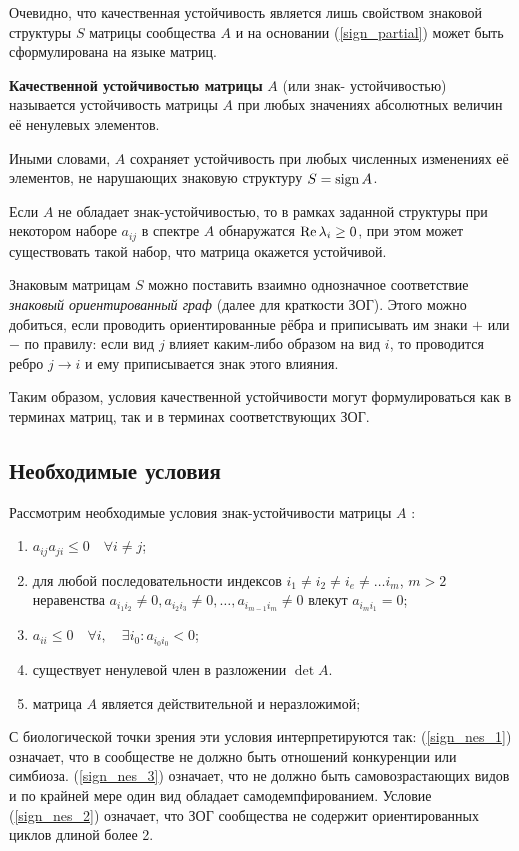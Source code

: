     Очевидно, что качественная устойчивость является лишь свойством знаковой структуры \(S\) матрицы сообщества \(A\) и на основании (\ref{sign_partial}) может быть сформулирована на языке матриц.
    \begin{definition}
        \textbf{Качественной устойчивостью матрицы} \(A\) (или знак- \hspace{-2pt}устойчивостью) называется устойчивость матрицы \(A\) при любых значениях абсолютных величин её ненулевых элементов.
    \end{definition}
    Иными словами, \(A\) сохраняет устойчивость при любых численных изменениях её элементов, не нарушающих знаковую структуру \(S = \operatorname{sign} A\).

    Если \(A\) не обладает знак-устойчивостью, то в рамках заданной структуры при некотором наборе \({a_{ij}}\) в спектре \(A\) обнаружатся \(\operatorname{Re} \lambda_i \geq 0\), при этом может существовать такой набор, что матрица окажется устойчивой.

    Знаковым матрицам \(S\) можно поставить взаимно однозначное соответствие \textit{знаковый ориентированный граф} (далее для краткости ЗОГ). Этого можно добиться, если проводить ориентированные рёбра и приписывать им знаки \(+\) или \(-\) по правилу: если вид \(j\) влияет каким-либо образом на вид \(i\), то проводится ребро \(j \to i\) и ему приписывается знак этого влияния. 

    Таким образом, условия качественной устойчивости могут формулироваться как в терминах матриц, так и в терминах соответствующих ЗОГ.

\subsection{Необходимые условия}

    Рассмотрим необходимые условия знак-устойчивости матрицы \(A\) \cite{quirk_rupert}:
    \begin{enumerate}
        \item \(a_{ij} a_{ji} \leq 0 \quad \forall i \neq j\); \label{sign_nes_1}
        \item для любой последовательности индексов \(i_1 \neq i_2 \neq i_e \neq \dots i_m \), \(m > 2\) неравенства \(a_{i_1 i_2} \neq 0, a_{i_2 i_3} \neq 0, \dots, a_{i_{m-1} i_m} \neq 0\) влекут \(a_{i_m i_1} = 0\); \label{sign_nes_2}
        \item \(a_{ii} \leq 0 \quad \forall i, \quad \exists i_0 : a_{i_0 i_0} < 0\); \label{sign_nes_3}
        \item существует ненулевой член в разложении \(\det A\). \label{sign_nes_4}
        \item матрица \(A\) является действительной и неразложимой; \label{sign_nes_neraz}
    \end{enumerate}
    С биологической точки зрения эти условия интерпретируются так: (\ref{sign_nes_1}) означает, что в сообществе не должно быть отношений конкуренции или симбиоза. (\ref{sign_nes_3}) означает, что не должно быть самовозрастающих видов и по крайней мере один вид обладает самодемпфированием. Условие (\ref{sign_nes_2}) означает, что ЗОГ сообщества не содержит ориентированных циклов длиной более 2.

